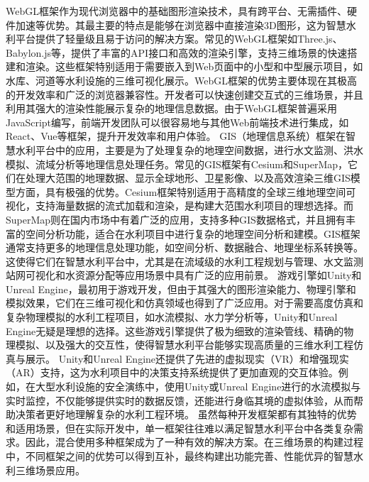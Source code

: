 WebGL框架作为现代浏览器中的基础图形渲染技术，具有跨平台、无需插件、硬件加速等优势。其最主要的特点是能够在浏览器中直接渲染3D图形，这为智慧水利平台提供了轻量级且易于访问的解决方案。常见的WebGL框架如Three.js、Babylon.js等，提供了丰富的API接口和高效的渲染引擎，支持三维场景的快速搭建和渲染。这些框架特别适用于需要嵌入到Web页面中的小型和中型展示项目，如水库、河道等水利设施的三维可视化展示。WebGL框架的优势主要体现在其极高的开发效率和广泛的浏览器兼容性。开发者可以快速创建交互式的三维场景，并且利用其强大的渲染性能展示复杂的地理信息数据。由于WebGL框架普遍采用JavaScript编写，前端开发团队可以很容易地与其他Web前端技术进行集成，如React、Vue等框架，提升开发效率和用户体验。 GIS（地理信息系统）框架在智慧水利平台中的应用，主要是为了处理复杂的地理空间数据，进行水文监测、洪水模拟、流域分析等地理信息处理任务。常见的GIS框架有Cesium和SuperMap，它们在处理大范围的地理数据、显示全球地形、卫星影像、以及高效渲染三维GIS模型方面，具有极强的优势。Cesium框架特别适用于高精度的全球三维地理空间可视化，支持海量数据的流式加载和渲染，是构建大范围水利项目的理想选择。而SuperMap则在国内市场中有着广泛的应用，支持多种GIS数据格式，并且拥有丰富的空间分析功能，适合在水利项目中进行复杂的地理空间分析和建模。GIS框架通常支持更多的地理信息处理功能，如空间分析、数据融合、地理坐标系转换等。这使得它们在智慧水利平台中，尤其是在流域级的水利工程规划与管理、水文监测站网可视化和水资源分配等应用场景中具有广泛的应用前景。 游戏引擎如Unity和Unreal Engine，最初用于游戏开发，但由于其强大的图形渲染能力、物理引擎和模拟效果，它们在三维可视化和仿真领域也得到了广泛应用。对于需要高度仿真和复杂物理模拟的水利工程项目，如水流模拟、水力学分析等，Unity和Unreal Engine无疑是理想的选择。这些游戏引擎提供了极为细致的渲染管线、精确的物理模拟、以及强大的交互性，使得智慧水利平台能够实现高质量的三维水利工程仿真与展示。 Unity和Unreal Engine还提供了先进的虚拟现实（VR）和增强现实（AR）支持，这为水利项目中的决策支持系统提供了更加直观的交互体验。例如，在大型水利设施的安全演练中，使用Unity或Unreal Engine进行的水流模拟与实时监控，不仅能够提供实时的数据反馈，还能进行身临其境的虚拟体验，从而帮助决策者更好地理解复杂的水利工程环境。 虽然每种开发框架都有其独特的优势和适用场景，但在实际开发中，单一框架往往难以满足智慧水利平台中各类复杂需求。因此，混合使用多种框架成为了一种有效的解决方案。在三维场景的构建过程中，不同框架之间的优势可以得到互补，最终构建出功能完善、性能优异的智慧水利三维场景应用。 